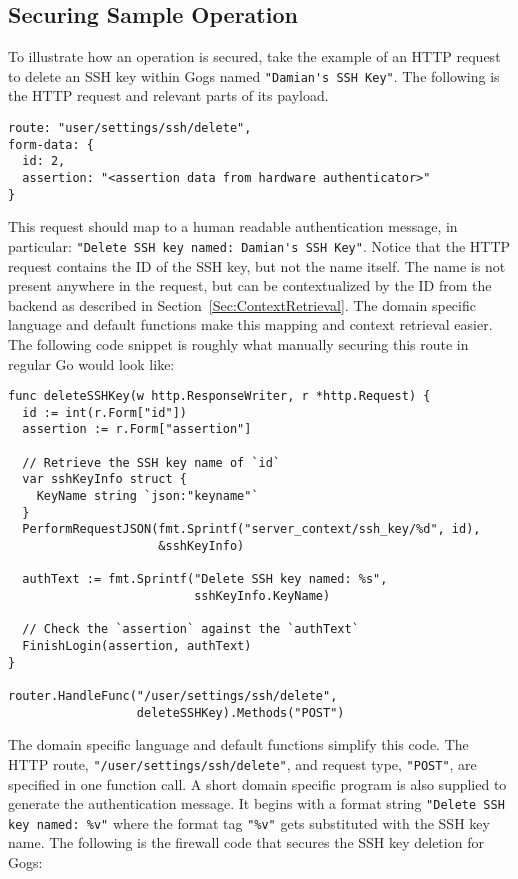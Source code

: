 \subsection{Securing Sample Operation}

To illustrate how an operation is secured, take the example of an HTTP request to delete an SSH key within Gogs named \lstinline{"Damian's SSH Key"}. The following is the HTTP request and relevant parts of its payload.

\begin{lstlisting}[float=h] 
route: "user/settings/ssh/delete",
form-data: {
  id: 2,
  assertion: "<assertion data from hardware authenticator>"
}
\end{lstlisting}

This request should map to a human readable authentication message, in particular: \lstinline{"Delete SSH key named: Damian's SSH Key"}. Notice that the HTTP request contains the ID of the SSH key, but not the name itself. The name is not present anywhere in the request, but can be contextualized by the ID from the backend as described in Section~\ref{Sec:ContextRetrieval}. The domain specific language and default functions make this mapping and context retrieval easier. The following code snippet is roughly what manually securing this route in regular Go would look like:

\begin{lstlisting}[float=h] 
func deleteSSHKey(w http.ResponseWriter, r *http.Request) {
  id := int(r.Form["id"])
  assertion := r.Form["assertion"]

  // Retrieve the SSH key name of `id`
  var sshKeyInfo struct {
    KeyName string `json:"keyname"`
  }
  PerformRequestJSON(fmt.Sprintf("server_context/ssh_key/%d", id),
                     &sshKeyInfo)

  authText := fmt.Sprintf("Delete SSH key named: %s", 
                          sshKeyInfo.KeyName)

  // Check the `assertion` against the `authText`
  FinishLogin(assertion, authText)
}

router.HandleFunc("/user/settings/ssh/delete", 
                  deleteSSHKey).Methods("POST")
\end{lstlisting}

The domain specific language and default functions simplify this code. The HTTP route, \lstinline{"/user/settings/ssh/delete"}, and request type, \lstinline{"POST"}, are specified in one function call. A short domain specific program is also supplied to generate the authentication message. It begins with a format string \lstinline{"Delete SSH key named: %v"} where the format tag \lstinline{"%v"} gets substituted with the SSH key name. The following is the firewall code that secures the SSH key deletion for Gogs:

